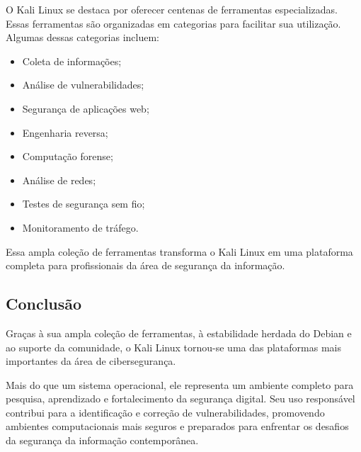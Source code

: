 \documentclass{article}
\begin{document}
O Kali Linux se destaca por oferecer centenas de ferramentas especializadas. Essas ferramentas são organizadas em categorias para facilitar sua utilização. Algumas dessas categorias incluem:

\begin{itemize}
\item Coleta de informações;
\item Análise de vulnerabilidades;
\item Segurança de aplicações web;
\item Engenharia reversa;
\item Computação forense;
\item Análise de redes;
\item Testes de segurança sem fio;
\item Monitoramento de tráfego.
\end{itemize}

Essa ampla coleção de ferramentas transforma o Kali Linux em uma plataforma completa para profissionais da área de segurança da informação.

\subsection{Conclusão}

Graças à sua ampla coleção de ferramentas, à estabilidade herdada do Debian e ao suporte da comunidade, o Kali Linux tornou-se uma das plataformas mais importantes da área de cibersegurança.

Mais do que um sistema operacional, ele representa um ambiente completo para pesquisa, aprendizado e fortalecimento da segurança digital. Seu uso responsável contribui para a identificação e correção de vulnerabilidades, promovendo ambientes computacionais mais seguros e preparados para enfrentar os desafios da segurança da informação contemporânea.

\clearpage
\end{document}
